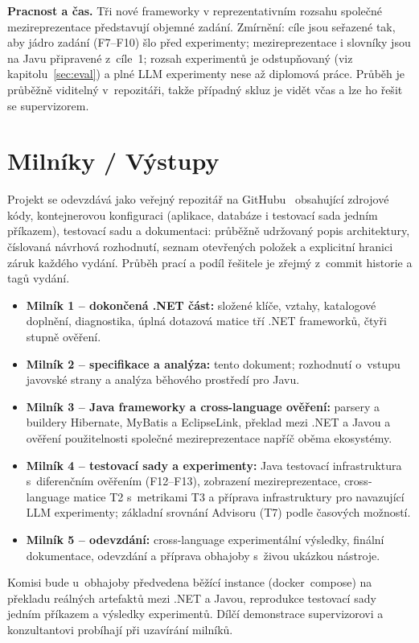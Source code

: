 \documentclass{article}
\begin{document}
\textbf{Pracnost a čas.} Tři nové frameworky v reprezentativním rozsahu společné mezireprezentace představují objemné zadání. Zmírnění: cíle jsou seřazené tak, aby jádro zadání (F7--F10) šlo před experimenty; mezireprezentace i slovníky jsou na Javu připravené z~cíle~1; rozsah experimentů je odstupňovaný (viz kapitolu~\ref{sec:eval}) a plné LLM experimenty nese až diplomová práce. Průběh je průběžně viditelný v~repozitáři, takže případný skluz je vidět včas a lze ho řešit se supervizorem.

\section{Milníky / Výstupy}

Projekt se odevzdává jako veřejný repozitář na GitHubu~\cite{fork-repo} obsahující zdrojové kódy, kontejnerovou konfiguraci (aplikace, databáze i testovací sada jedním příkazem), testovací sadu a dokumentaci: průběžně udržovaný popis architektury, číslovaná návrhová rozhodnutí, seznam otevřených položek a explicitní hranici záruk každého vydání. Průběh prací a podíl řešitele je zřejmý z~commit historie a tagů vydání.

\begin{itemize}[leftmargin=*,itemsep=0pt]
\item \textbf{Milník 1 -- dokončená .NET část:} složené klíče, vztahy, katalogové doplnění, diagnostika, úplná dotazová matice tří .NET frameworků, čtyři stupně ověření.
\item \textbf{Milník 2 -- specifikace a analýza:} tento dokument; rozhodnutí o~vstupu javovské strany a analýza běhového prostředí pro Javu.
\item \textbf{Milník 3 -- Java frameworky a cross-language ověření:} parsery a buildery Hibernate, MyBatis a EclipseLink, překlad mezi .NET a Javou a ověření použitelnosti společné mezireprezentace napříč oběma ekosystémy.
\item \textbf{Milník 4 -- testovací sady a experimenty:} Java testovací infrastruktura s~diferenčním ověřením (F12--F13), zobrazení mezireprezentace, cross-language matice T2 s~metrikami T3 a příprava infrastruktury pro navazující LLM experimenty; základní srovnání Advisoru (T7) podle časových možností.
\item \textbf{Milník 5 -- odevzdání:} cross-language experimentální výsledky, finální dokumentace, odevzdání a příprava obhajoby s~živou ukázkou nástroje.
\end{itemize}

Komisi bude u~obhajoby předvedena běžící instance (docker~compose) na překladu reálných artefaktů mezi .NET a Javou, reprodukce testovací sady jedním příkazem a výsledky experimentů. Dílčí demonstrace supervizorovi a konzultantovi probíhají při uzavírání milníků.
\end{document}
